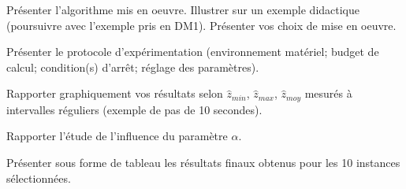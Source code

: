 \documentclass[10pt]{article}
\begin{document}
%
%

\vspace{5mm}
\noindent
{}
\vspace{2mm}

\noindent
Présenter l'algorithme mis en oeuvre. Illustrer sur un exemple didactique (poursuivre avec l'exemple pris en DM1). Présenter vos choix de mise en oeuvre.

%
%

\vspace{5mm}
\noindent
{}
\vspace{2mm}

\noindent
Présenter le protocole d'expérimentation (environnement matériel; budget de calcul; condition(s) d'arrêt; réglage des paramètres).

\noindent
Rapporter graphiquement vos résultats selon $\hat{z}_{min}$, $\hat{z}_{max}$, $\hat{z}_{moy}$ mesurés à intervalles réguliers (exemple de pas de 10 secondes).

\noindent
Rapporter l'étude de l'influence du paramètre $\alpha$.

\noindent
Présenter sous forme de tableau les résultats finaux obtenus pour les 10 instances sélectionnées.

%
%
\end{document}
